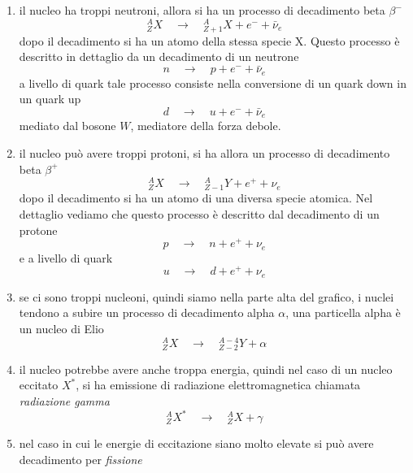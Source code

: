 \begin{enumerate}
\item  il nucleo ha troppi neutroni, allora si ha un processo di decadimento beta $\beta^-$
\begin{equation}
^{A}_{Z}X \quad\longrightarrow\quad  ^{A}_{Z+1}X + e^- + \bar\nu_e
\end{equation}
dopo il decadimento si ha un atomo della stessa specie X.
Questo processo è descritto in dettaglio da un decadimento di un neutrone
\begin{equation}
n \quad\longrightarrow\quad p + e^- + \bar\nu_e
\end{equation}
a livello di quark tale processo consiste nella conversione di un quark down in un quark up
\begin{equation}
d \quad\longrightarrow\quad u + e^- + \bar\nu_e
\end{equation}
mediato dal bosone $W$, mediatore della forza debole.

\item il nucleo può avere troppi protoni, si ha allora un processo di decadimento beta $\beta^+$
\begin{equation}
^{A}_{Z}X \quad\longrightarrow\quad ^{A}_{Z-1}Y + e^+ + \nu_e
\end{equation}
dopo il decadimento si ha un atomo di una diversa specie atomica.
Nel dettaglio vediamo che questo processo è descritto dal decadimento di un protone
\begin{equation}
p \quad\longrightarrow\quad n + e^+ + \nu_e
\end{equation}
e a livello di quark 
\begin{equation}
u \quad\longrightarrow\quad d + e^+ + \nu_e
\end{equation}

\item se ci sono troppi nucleoni, quindi siamo nella parte alta del grafico, i nuclei tendono a subire un processo di decadimento alpha $\alpha$, una particella alpha è un nucleo di Elio
\begin{equation}
^{A}_{Z}X \quad\longrightarrow\quad ^{A-4}_{Z-2}Y + \alpha
\end{equation}

\item il nucleo potrebbe avere anche troppa energia, quindi nel caso di un nucleo eccitato $X^{\ast}$, si ha emissione di radiazione elettromagnetica chiamata \emph{radiazione gamma}
\begin{equation}
^{A}_{Z}X^{\ast} \quad\longrightarrow\quad ^{A}_{Z}X + \gamma
\end{equation}

\item nel caso in cui le energie di eccitazione siano molto elevate si può avere decadimento per \emph{fissione} 
\end{enumerate}

